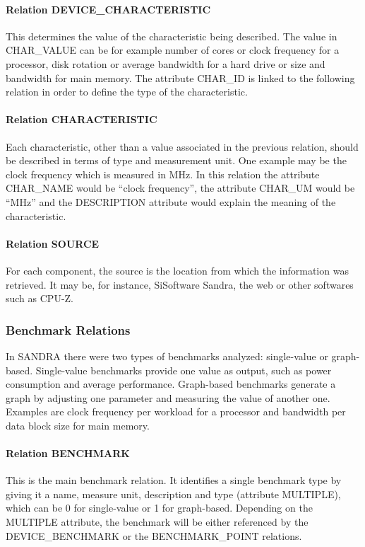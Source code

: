         \paragraph*{Relation DEVICE\_CHARACTERISTIC}
            This determines the value of the characteristic being described. The value in CHAR\_VALUE can be for example number of cores or clock frequency for a processor, disk rotation or average bandwidth for a hard drive or size and bandwidth for main memory. The attribute CHAR\_ID is linked to the following relation in order to define the type of the characteristic.
            
        \paragraph*{Relation CHARACTERISTIC}
            Each characteristic, other than a value associated in the previous relation, should be described in terms of type and measurement unit. One example may be the clock frequency which is measured in MHz. In this relation the attribute CHAR\_NAME would be ``clock frequency'', the attribute CHAR\_UM would be ``MHz'' and the DESCRIPTION attribute would explain the meaning of the characteristic.
            
        \paragraph*{Relation SOURCE}
            For each component, the source is the location from which the information was retrieved. It may be, for instance, SiSoftware Sandra, the web or other softwares such as CPU-Z.
            
    \subsubsection*{Benchmark Relations}
        In SANDRA there were two types of benchmarks analyzed: single-value or graph-based. Single-value benchmarks provide one value as output, such as power consumption and average performance. Graph-based benchmarks generate a graph by adjusting one parameter and measuring the value of another one. Examples are clock frequency per workload for a processor and bandwidth per data block size for main memory. 

        \paragraph*{Relation BENCHMARK}
            This is the main benchmark relation. It identifies a single benchmark type by giving it a name, measure unit, description and type (attribute MULTIPLE), which can be 0 for single-value or 1 for graph-based. Depending on the MULTIPLE attribute, the benchmark will be either referenced by the DEVICE\_BENCHMARK or the BENCHMARK\_POINT relations.

